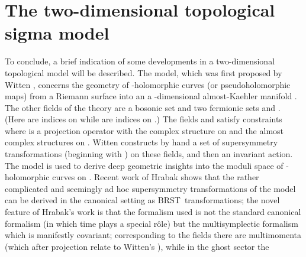 \documentclass[a4paper,fleqn,12pt]{article}
\providecommand{\Etamu}{\eta^{\mu}}
\providecommand{\BRST}{{\small BRST}}
\begin{document}
 \section{The two-dimensional topological sigma \hfil\break model}
%
To conclude, a brief indication of some developments in a
two-dimensional topological model will be described. The model,
which was first proposed by Witten \cite{Witten88}, concerns the
geometry of \coordHE{}-holomorphic curves (or pseudoholomorphic maps)
\coordHE{}  from a Riemann surface \myHighlight{$\Sigma$}\coordHE{} into an a
\coordHE{}-dimensional almost-Kaehler manifold \coordHE{}. The other fields of
the theory are a bosonic set \coordHE{} and two fermionic
sets \myHighlight{$\Etamu$}\coordHE{} and \myHighlight{$\pi^{\alpha}_{\mu}$}\coordHE{}. (Here \coordHE{} are
indices on \myHighlight{$\Sigma$}\coordHE{} while \coordHE{} are indices on \coordHE{}.)
The fields \coordHE{} and \myHighlight{$\pi$}\coordHE{} satisfy constraints
 \coordHE{} where
 \coordHE{}
is a projection operator with \myHighlight{$\epsilon$}\coordHE{} the complex structure on
\myHighlight{$\Sigma$}\coordHE{} and \coordHE{} the almost complex structures on \coordHE{}. Witten
constructs by hand a set of supersymmetry transformations
(beginning with \coordHE{}) on these
fields, and then an invariant action. The model is used to derive
deep geometric insights into the moduli space of \coordHE{}-holomorphic
curves on \coordHE{}. Recent work of Hrabak \cite{Hrabak} shows that the
rather complicated and seemingly ad hoc supersymmetry
transformations of the model can be derived in the canonical
setting as \BRST\ transformations; the novel feature of Hrabak's
work is that the formalism used is not the standard canonical
formalism (in which time plays a special r\^ole) but the
multisymplectic formalism which is manifestly covariant;
corresponding to the fields \coordHE{} there are
multimomenta \coordHE{} (which after projection relate to
Witten's  \coordHE{}), while in the ghost sector the
\end{document}
